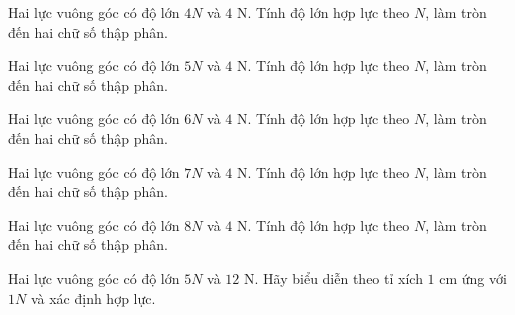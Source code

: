 \begin{ex}
Hai lực vuông góc có độ lớn $4N$ và $4$ N. Tính độ lớn hợp lực theo $N$, làm tròn đến hai chữ số thập phân.
\end{ex}

\begin{ex}
Hai lực vuông góc có độ lớn $5N$ và $4$ N. Tính độ lớn hợp lực theo $N$, làm tròn đến hai chữ số thập phân.
\end{ex}

\begin{ex}
Hai lực vuông góc có độ lớn $6N$ và $4$ N. Tính độ lớn hợp lực theo $N$, làm tròn đến hai chữ số thập phân.
\end{ex}

\begin{ex}
Hai lực vuông góc có độ lớn $7N$ và $4$ N. Tính độ lớn hợp lực theo $N$, làm tròn đến hai chữ số thập phân.
\end{ex}

\begin{ex}
Hai lực vuông góc có độ lớn $8N$ và $4$ N. Tính độ lớn hợp lực theo $N$, làm tròn đến hai chữ số thập phân.
\end{ex}

\begin{bt}
Hai lực vuông góc có độ lớn $5N$ và $12$ N. Hãy biểu diễn theo tỉ xích $1$ cm ứng với $1N$ và xác định hợp lực.
\end{bt}


